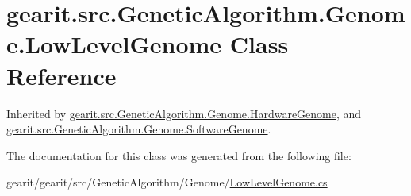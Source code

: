 \hypertarget{classgearit_1_1src_1_1_genetic_algorithm_1_1_genome_1_1_low_level_genome}{\section{gearit.\+src.\+Genetic\+Algorithm.\+Genome.\+Low\+Level\+Genome Class Reference}
\label{classgearit_1_1src_1_1_genetic_algorithm_1_1_genome_1_1_low_level_genome}
}


Inherited by \hyperlink{classgearit_1_1src_1_1_genetic_algorithm_1_1_genome_1_1_hardware_genome}{gearit.\+src.\+Genetic\+Algorithm.\+Genome.\+Hardware\+Genome}, and \hyperlink{classgearit_1_1src_1_1_genetic_algorithm_1_1_genome_1_1_software_genome}{gearit.\+src.\+Genetic\+Algorithm.\+Genome.\+Software\+Genome}.



The documentation for this class was generated from the following file\+:\begin{DoxyCompactItemize}
\item 
gearit/gearit/src/\+Genetic\+Algorithm/\+Genome/\hyperlink{_low_level_genome_8cs}{Low\+Level\+Genome.\+cs}\end{DoxyCompactItemize}
